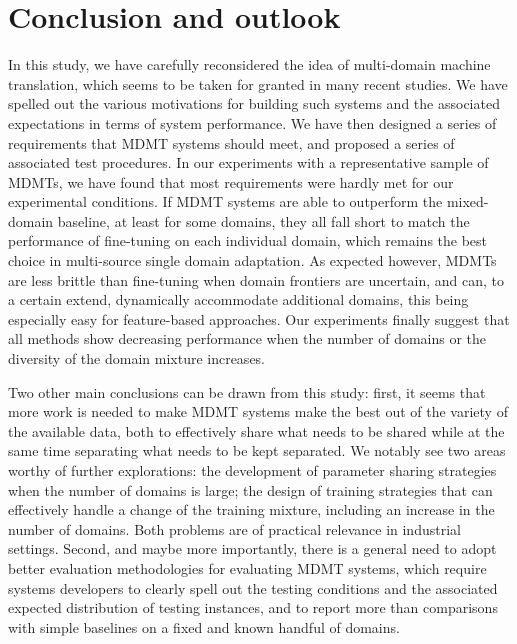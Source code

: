 \documentclass[11pt,a4paper]{article}
\newcommand{\fyDone}[1]{\done[FY]\Todo[FY:]{\textcolor{orange}{#1}}}
\newcommand{\fyFuture}[1]{\done[FY]\Todo[FY:]{\textcolor{red}{#1}}}
\newcommand{\revisiondel}[1]{}
\begin{document}
\section{Conclusion and outlook \label{sec:conclusion}}
\fyDone{Write conclusions}\fyFuture{no mixture of experts}
In this study, we have carefully reconsidered the idea of multi-domain machine translation, which seems to be taken for granted in many recent studies. We have spelled out the various motivations for building such systems and the associated expectations in terms of system performance. We have then designed a series of requirements that MDMT systems should meet, and proposed a series of associated test procedures. In our experiments with a representative sample of MDMTs, we have found that most requirements were hardly met for our experimental conditions. If MDMT systems are able to outperform the mixed-domain baseline, at least for some domains, they all fall short to match the performance of fine-tuning on each individual domain, which remains the best choice in multi-source single domain adaptation.
\revisiondel{In this scenario, architecture-based strategies aimed at parameter sharing and/or representation normalization obtain the best results.}\fyDone{Mitigate this}
As expected however, MDMTs are less brittle than fine-tuning when domain frontiers are uncertain, and can, to a certain extend, dynamically accommodate additional domains, this being especially easy for feature-based approaches. Our experiments finally suggest that all methods show decreasing performance when the number of domains or the diversity of the domain mixture increases. %

Two other main conclusions can be drawn from this study: first, it seems that more work is needed to make MDMT systems make the best out of the variety of the available data, both to effectively share what needs to be shared while at the same time separating what needs to be kept separated. We notably see two areas worthy of further explorations: the development of parameter sharing strategies when the number of domains is large; the design of training strategies that can effectively handle a change of the training mixture, including an increase in the number of domains. Both problems are of practical relevance in industrial settings. Second, and maybe more importantly, there is a general need to adopt better evaluation methodologies for evaluating MDMT systems, which require systems developers to clearly spell out the testing conditions and the associated expected distribution of testing instances, and to report more than comparisons with simple baselines on a fixed and known handful of domains.
\end{document}
